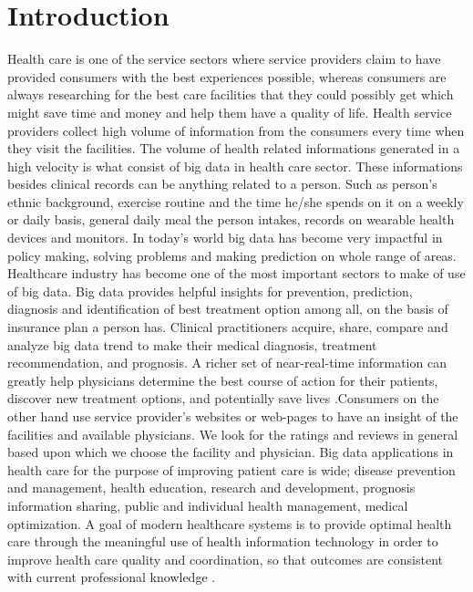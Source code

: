 \documentclass[sigconf]{acmart}
\begin{document}
\section{Introduction}
Health care is one of the service sectors where service providers claim to have provided consumers with the best experiences 
possible, whereas consumers are always researching for the best care facilities that they could possibly get which might save 
time and money and help them have a quality of life. Health service providers collect high volume of information from the 
consumers every time when they visit the facilities. The volume of health related informations generated in a high velocity 
is what consist of big data in health care sector.
These informations besides clinical records can be anything related to a person. Such as  person's ethnic background, exercise routine
and the time he/she spends on it on a weekly or daily basis, general daily meal the person intakes, records on wearable health devices 
and monitors. In today's world big data has become very impactful in policy making, solving problems and making prediction on 
whole range 
of areas. Healthcare industry has become one of the most important sectors to make of use of big data. Big data provides 
helpful insights 
for prevention, prediction, diagnosis and identification of best treatment option among all, on the basis of insurance plan a person 
has. Clinical practitioners acquire, share, compare and analyze big data trend to make their medical diagnosis, treatment
recommendation, and prognosis. A richer set of near-real-time information can greatly help
physicians determine the best course of action for their patients, discover new treatment
options, and potentially save lives \cite{www-hpe}.Consumers on the other hand use service provider's websites or web-pages 
to have an insight of the facilities and available physicians.
We look for the ratings and reviews in general based upon which we choose the facility and physician. Big data applications in 
health care for the purpose of
improving patient care is wide; disease prevention and management, health education, research and development, prognosis  
information sharing, public and individual health management, medical optimization. A goal of modern healthcare systems is to
provide optimal health care through the meaningful use of health information technology in order to improve health care quality 
and coordination, so that outcomes are consistent with current professional knowledge \cite{www-mapr-com}.
\end{document}
